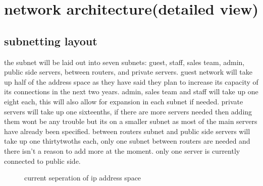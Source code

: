 \documentclass[11pt]{article}
\begin{document}
\section{network architecture(detailed view)}
\subsection{subnetting layout}
the subnet will be laid out into seven subnets: guest, staff, sales team, admin, public side servers, between routers, and private servers.\newline
 guest network will take up half of the address space as they have said they plan to increase its capacity of its connections in the next two years. admin, sales team and staff will take up one eight each, this will also allow for expansion in each subnet if needed. private servers will take up one sixteenths, if there are more servers needed then adding them wont be any trouble but its  on a smaller subnet as most of the main servers have already been specified. between routers subnet and public side servers will take up one thirtytwoths each, only one subnet between routers are needed and there isn't a reason to add more at the moment. only one server is currently connected to public side. 
\begin{figure}[!hbt]
	\begin{center}
	\end{center}
	\caption{current seperation of ip address space}
\end{figure}
\end{document}
